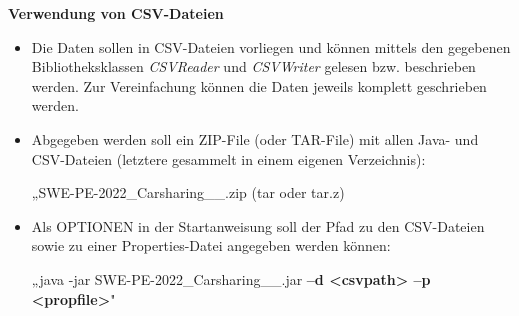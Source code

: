 \textbf{Verwendung von CSV-Dateien}

\begin{itemize}
    \item Die Daten sollen in CSV-Dateien vorliegen und können mittels den gegebenen Bibliotheksklassen \emph{CSVReader} und \emph{CSVWriter} gelesen bzw. beschrieben werden. Zur Vereinfachung können die Daten jeweils komplett geschrieben werden.
    \item Abgegeben werden soll ein ZIP-File (oder TAR-File) mit allen Java- und CSV-Dateien (letztere gesammelt in einem eigenen Verzeichnis): 

    „SWE-PE-2022\_Carsharing\_<n1>\_<n2>.zip (tar oder tar.z)  
    \item Als OPTIONEN in der Startanweisung soll der Pfad zu den CSV-Dateien sowie zu einer Properties-Datei angegeben werden können: 

    „java -jar SWE-PE-2022\_Carsharing\_<n1>\_<n2>.jar \textbf{–d <csvpath> –p <propfile>}"
\end{itemize}